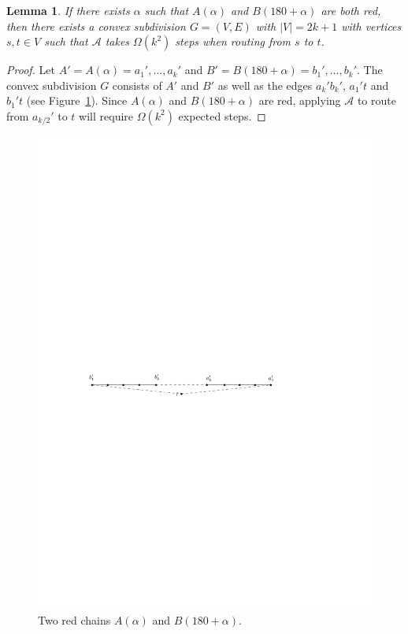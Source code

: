 \documentclass [letterpaper] {patmorin}
\newtheorem{lemma}{Lemma}%
\begin{document}
\begin{lemma}\label{lem:2red}
If there exists $\alpha$ such that $A(\alpha)$ and $B(180+\alpha)$ are both red, then there exists a convex subdivision $G=(V,E)$ with $|V|=2k+1$ with vertices $s,t\in V$ such that $\mathcal{A}$ takes $\Omega(k^2)$ steps when routing from $s$ to $t$.  
\end{lemma} 

\begin{proof}
Let $A'=A(\alpha)=a_1',\ldots,a_k'$ and $B'=B(180+\alpha)=b_1',\ldots,b_k'$.  The convex subdivision $G$ consists of $A'$ and $B'$ as well as the edges $a_k'b_k'$, $a_1't$ and $b_1't$ (see Figure~\ref{fig:2red}).  Since $A(\alpha)$ and $B(180+\alpha)$ are red, applying $\mathcal{A}$ to route from $a_{k/2}'$ to $t$ will require $\Omega(k^2)$ expected steps.
\end{proof}

\begin{figure}
  \centering
  \includegraphics{pics/2red.pdf}
  \caption{Two red chains $A(\alpha)$ and $B(180+\alpha)$.}
  \label{fig:2red}
\end{figure}
\end{document}
